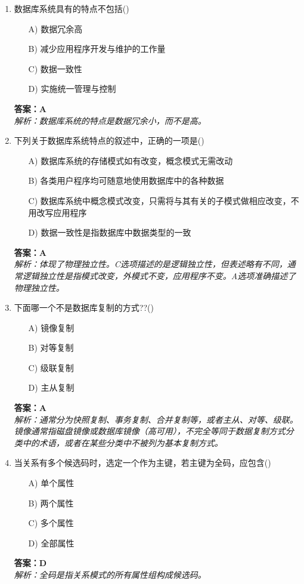 \documentclass[a4paper,12pt]{article}
\begin{document}
\begin{enumerate}[label=\arabic*.]
\item 数据库系统具有的特点不包括()
\begin{itemize}
    \item[A)] 数据冗余高
    \item[B)] 减少应用程序开发与维护的工作量
    \item[C)] 数据一致性
    \item[D)] 实施统一管理与控制
\end{itemize}
\textbf{答案：A} \\
\textit{解析：数据库系统的特点是数据冗余小，而不是高。}

\item 下列关于数据库系统特点的叙述中，正确的一项是()
\begin{itemize}
    \item[A)] 数据库系统的存储模式如有改变，概念模式无需改动
    \item[B)] 各类用户程序均可随意地使用数据库中的各种数据
    \item[C)] 数据库系统中概念模式改变，只需将与其有关的子模式做相应改变，不用改写应用程序
    \item[D)] 数据一致性是指数据库中数据类型的一致
\end{itemize}
\textbf{答案：A} \\
\textit{解析：体现了物理独立性。C选项描述的是逻辑独立性，但表述略有不同，通常逻辑独立性是指模式改变，外模式不变，应用程序不变。A选项准确描述了物理独立性。}

\item 下面哪一个不是数据库复制的方式??()
\begin{itemize}
    \item[A)] 镜像复制
    \item[B)] 对等复制
    \item[C)] 级联复制
    \item[D)] 主从复制
\end{itemize}
\textbf{答案：A} \\
\textit{解析：通常分为快照复制、事务复制、合并复制等，或者主从、对等、级联。镜像通常指磁盘镜像或数据库镜像（高可用），不完全等同于数据复制方式分类中的术语，或者在某些分类中不被列为基本复制方式。}

\item 当关系有多个候选码时，选定一个作为主键，若主键为全码，应包含()
\begin{itemize}
    \item[A)] 单个属性
    \item[B)] 两个属性
    \item[C)] 多个属性
    \item[D)] 全部属性
\end{itemize}
\textbf{答案：D} \\
\textit{解析：全码是指关系模式的所有属性组构成候选码。}


\end{enumerate}
\end{document}
